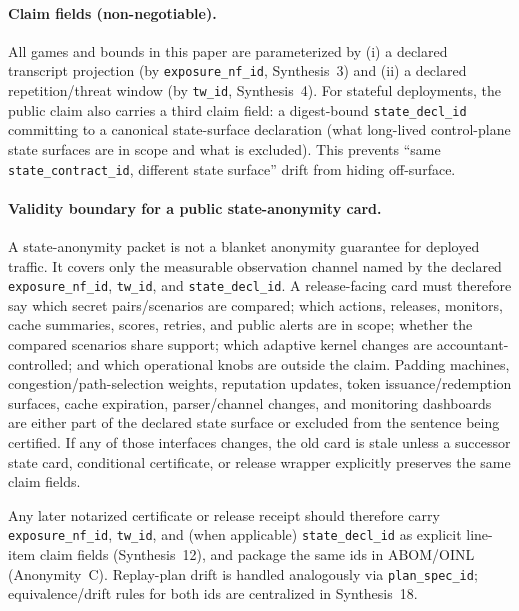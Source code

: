 \documentclass[11pt]{article}
\begin{document}
\paragraph{Claim fields (non-negotiable).}
All games and bounds in this paper are parameterized by
(i) a declared transcript projection (by \texttt{exposure\_nf\_id}, Synthesis~3) and
(ii) a declared repetition/threat window (by \texttt{tw\_id}, Synthesis~4).\cite{series:traceifaces,series:threatwindows}
For stateful deployments, the public claim also carries a third claim field:
a digest-bound \texttt{state\_decl\_id} committing to a canonical state-surface declaration (what long-lived control-plane state surfaces are in scope and what is excluded).\cite{series:planstateequiv,series:workedexample}
This prevents ``same \texttt{state\_contract\_id}, different state surface'' drift from hiding off-surface.

\paragraph{Validity boundary for a public state-anonymity card.}
A state-anonymity packet is not a blanket anonymity guarantee for deployed traffic.
It covers only the measurable observation channel named by the declared \texttt{exposure\_nf\_id}, \texttt{tw\_id}, and \texttt{state\_decl\_id}.
A release-facing card must therefore say which secret pairs/scenarios are compared; which actions, releases, monitors, cache summaries, scores, retries, and public alerts are in scope; whether the compared scenarios share support; which adaptive kernel changes are accountant-controlled; and which operational knobs are outside the claim.
Padding machines, congestion/path-selection weights, reputation updates, token issuance/redemption surfaces, cache expiration, parser/channel changes, and monitoring dashboards are either part of the declared state surface or excluded from the sentence being certified.
If any of those interfaces changes, the old card is stale unless a successor state card, conditional certificate, or release wrapper explicitly preserves the same claim fields.\cite{series:state3,series:condcert,series:deployedsurfaces,series:planstateequiv,kifer2014pufferfish}

Any later notarized certificate or release receipt should therefore carry \texttt{exposure\_nf\_id}, \texttt{tw\_id}, and (when applicable) \texttt{state\_decl\_id} as explicit line-item claim fields (Synthesis~12), and package the same ids in ABOM/OINL (Anonymity~C).\cite{series:receiptitems,series:abomoinl}
Replay-plan drift is handled analogously via \texttt{plan\_spec\_id}; equivalence/drift rules for both ids are centralized in Synthesis~18.\cite{series:planstateequiv}
\end{document}
